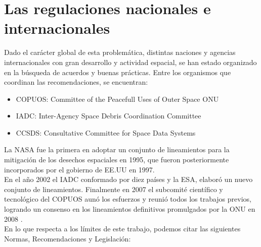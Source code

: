 


\section{Las regulaciones nacionales e internacionales}

Dado el car\'acter global de esta problem\'atica, distintas naciones y agencias internacionales con gran desarrollo y actividad espacial, se han estado organizado en la b\'usqueda de acuerdos y buenas pr\'acticas. Entre los organismos que coordinan las recomendaciones, se encuentran:\\

\begin{itemize}
\item COPUOS: Committee of the Peacefull Uses of Outer Space \ac{ONU}
\item IADC: Inter-Agency Space Debris Coordination Committee
\item CCSDS: Consultative Committee for Space Data Systems
\end{itemize}

La NASA fue la primera en adoptar un conjunto de lineamientos para la mitigaci\'on de los desechos espaciales en 1995, que fueron posteriormente incorporados por el gobierno de EE.UU en 1997.\\
En el a\~no 2002 el IADC conformado por diez pa\'ises y la ESA, elabor\'o un nuevo conjunto de lineamientos.
Finalmente en 2007 el subcomit\'e cient\'ifico y tecnol\'ogico del COPUOS aun\'o los esfuerzos y reuni\'o todos los trabajos previos, logrando un consenso en los lineamientos definitivos promulgados por la ONU en 2008 \citep{nasaprogramme}.\\

En lo que respecta a los l\'imites de este trabajo, podemos citar las siguientes Normas, Recomendaciones y Legislaci\'on:\\

